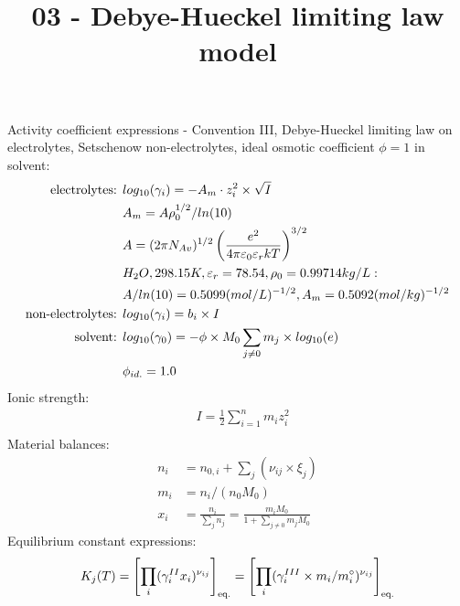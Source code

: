 \documentclass[onecolumn]{article}
\begin{document}
\title{03 - Debye-Hueckel limiting law model}
\author{}
\date{}
\maketitle
Activity coefficient expressions - Convention III, Debye-Hueckel
limiting law on electrolytes,
Setschenow non-electrolytes, ideal osmotic coefficient $\phi=1$ in solvent:
\begin{equation}
\label{eq:activity_coeff}
\begin{aligned}
\textnormal{electrolytes: } & log_{10}(\gamma_{i}) =
-A_m \cdot z_i^2 \times \sqrt{I} \\
& A_m = A \rho_0^{1/2}/ln(10) \\
& A = (2 \pi N_{Av})^{1/2}
\left({e^2}\over{4 \pi \varepsilon_0 \varepsilon_r  k T} \right)^{3/2}\\
& H_2O, 298.15K, \varepsilon_r=78.54, \rho_0=0.99714kg/L: \\
& A/ln(10)=0.5099 (mol/L)^{-1/2}, A_m=0.5092 (mol/kg)^{-1/2} \\
\textnormal{non-electrolytes: } & log_{10}(\gamma_{i}) = b_i \times I \\
\textnormal{solvent: } & log_{10}(\gamma_{0}) =
-\phi \times M_0 \sum_{j\neq0}{m_j} \times log_{10}(e)\\
 & \phi_{id.} =   1.0 \\
\end{aligned}
\end{equation}
Ionic strength:
\begin{equation}
\label{eq:ionic_strength}
\begin{aligned}
& I = \frac{1}{2} \sum_{i=1}^n m_i z_i^2 \\
\end{aligned}
\end{equation}
Material balances:
\begin{equation}
\begin{aligned}
\label{eq:mole_balance}
n_i &= n_{0,i} + \sum_j(\nu_{ij} \times \xi_j) \\
m_i &= n_i /(n_0 M_0) \\
x_i &= \frac{n_i}{\sum_j{n_j}}= \frac{m_i M_0}{1+\sum_{j\neq0}{m_j M_0}}
\end{aligned}
\end{equation}
Equilibrium constant expressions:
\begin{equation}
\label{eq:eq_expr}
K_j(T) = \left[ \prod_i(\gamma^{II}_i x_i)^{\nu_{ij}} \right]_{\textnormal{eq.}} =
\left[ \prod_i(\gamma^{III}_i \times m_i/m^{\circ}_i )^{\nu_{ij}} \right]_{\textnormal{eq.}}
\end{equation}
\end{document}
